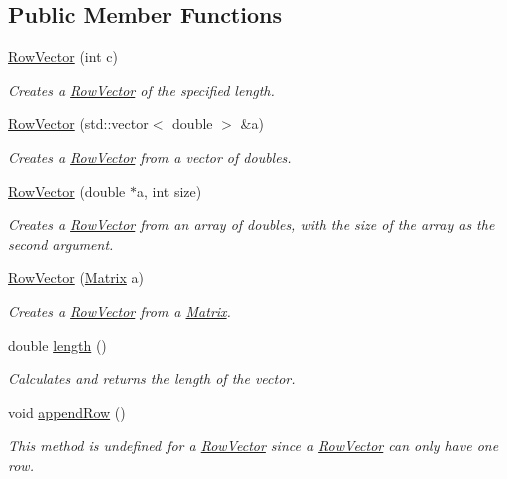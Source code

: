 \subsection*{Public Member Functions}
\begin{DoxyCompactItemize}
\item 
\hyperlink{class_row_vector_a2f27ef01198c0c996290f5d6d1680297}{RowVector} (int c)
\begin{DoxyCompactList}\small\item\em Creates a \hyperlink{class_row_vector}{RowVector} of the specified length. \item\end{DoxyCompactList}\item 
\hyperlink{class_row_vector_a6f0b27522b67138a7313c4a75750a7a6}{RowVector} (std::vector$<$ double $>$ \&a)
\begin{DoxyCompactList}\small\item\em Creates a \hyperlink{class_row_vector}{RowVector} from a vector of doubles. \item\end{DoxyCompactList}\item 
\hyperlink{class_row_vector_afdb9cc1d09c9dfaef6af93aec542f498}{RowVector} (double $\ast$a, int size)
\begin{DoxyCompactList}\small\item\em Creates a \hyperlink{class_row_vector}{RowVector} from an array of doubles, with the size of the array as the second argument. \item\end{DoxyCompactList}\item 
\hyperlink{class_row_vector_ae7733fb94cabd44dcb37f2ffabf2cdbc}{RowVector} (\hyperlink{class_matrix}{Matrix} a)
\begin{DoxyCompactList}\small\item\em Creates a \hyperlink{class_row_vector}{RowVector} from a \hyperlink{class_matrix}{Matrix}. \item\end{DoxyCompactList}\item 
double \hyperlink{class_row_vector_a5c2dde299464fd200026db5515480275}{length} ()
\begin{DoxyCompactList}\small\item\em Calculates and returns the length of the vector. \item\end{DoxyCompactList}\item 
void \hyperlink{class_row_vector_aa04552c6bdfed758bc06815d8696b44c}{appendRow} ()
\begin{DoxyCompactList}\small\item\em This method is undefined for a \hyperlink{class_row_vector}{RowVector} since a \hyperlink{class_row_vector}{RowVector} can only have one row. \item\end{DoxyCompactList}\end{DoxyCompactItemize}


